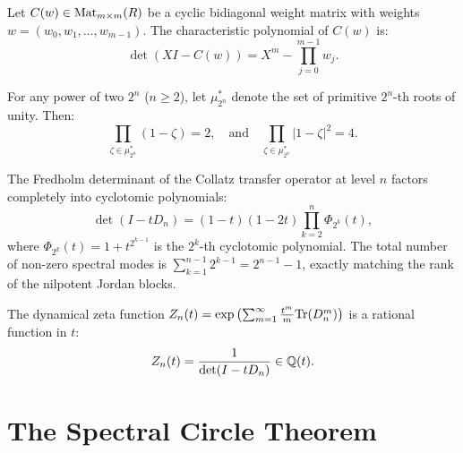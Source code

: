 \begin{theorem}
\label{thm:cyclic_weight_charpoly}
\leanok
Let $C(w) \in \mathrm{Mat}_{m \times m}(R)$ be a cyclic bidiagonal weight matrix with weights $w = (w_0, w_1, \ldots, w_{m-1})$. The characteristic polynomial of $C(w)$ is:
\[
\det(X I - C(w)) = X^m - \prod_{j=0}^{m-1} w_j.
\]
\end{theorem}

\begin{theorem}
\label{thm:cyclotomic_product}
\leanok
For any power of two $2^n$ ($n \ge 2$), let $\mu_{2^n}^*$ denote the set of primitive $2^n$-th roots of unity. Then:
\[
\prod_{\zeta \in \mu_{2^n}^*} (1 - \zeta) = 2, \quad \text{and} \quad \prod_{\zeta \in \mu_{2^n}^*} |1 - \zeta|^2 = 4.
\]
\end{theorem}

\begin{theorem}
\label{thm:dynamical_zeta_factorization}
\leanok
The Fredholm determinant of the Collatz transfer operator at level $n$ factors completely into cyclotomic polynomials:
\[
\det(I - t D_n) = (1 - t)(1 - 2t) \prod_{k=2}^n \Phi_{2^k}(t),
\]
where $\Phi_{2^k}(t) = 1 + t^{2^{k-1}}$ is the $2^k$-th cyclotomic polynomial.
The total number of non-zero spectral modes is $\sum_{k=1}^{n-1} 2^{k-1} = 2^{n-1} - 1$, exactly matching the rank of the nilpotent Jordan blocks.
\end{theorem}

\begin{theorem}
\label{thm:automaton_zeta_rationality}
\leanok
The dynamical zeta function $Z_n(t) = \exp\left(\sum_{m=1}^\infty \frac{t^m}{m} \mathrm{Tr}(D_n^m)\right)$ is a rational function in $t$:
\[
Z_n(t) = \frac{1}{\det(I - t D_n)} \in \mathbb{Q}(t).
\]
\end{theorem}

\section{The Spectral Circle Theorem}

